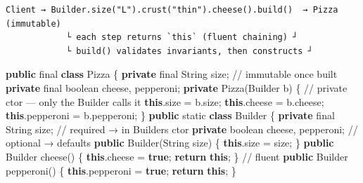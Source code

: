 \documentclass[11pt]{article}
\newenvironment{Shaded}{\begin{snugshade}}{\end{snugshade}}
\newcommand{\BuiltInTok}[1]{\textcolor[rgb]{0.50,0.55,0.55}{#1}}
\newcommand{\CommentTok}[1]{\textcolor[rgb]{0.48,0.49,0.49}{#1}}
\newcommand{\ControlFlowTok}[1]{\textcolor[rgb]{0.99,0.74,0.29}{\textbf{#1}}}
\newcommand{\DataTypeTok}[1]{\textcolor[rgb]{0.16,0.50,0.73}{#1}}
\newcommand{\FunctionTok}[1]{\textcolor[rgb]{0.56,0.27,0.68}{#1}}
\newcommand{\KeywordTok}[1]{\textcolor[rgb]{0.81,0.81,0.76}{\textbf{#1}}}
\newcommand{\NormalTok}[1]{\textcolor[rgb]{0.81,0.81,0.76}{#1}}
\newcommand{\OperatorTok}[1]{\textcolor[rgb]{0.81,0.81,0.76}{#1}}
\begin{document}
\setcodelang{}

\begin{verbatim}
Client → Builder.size("L").crust("thin").cheese().build()  → Pizza (immutable)
            └ each step returns `this` (fluent chaining) ┘
            └ build() validates invariants, then constructs ┘
\end{verbatim}


\begin{Shaded}
\begin{Highlighting}[]
\KeywordTok{public} \DataTypeTok{final} \KeywordTok{class}\NormalTok{ Pizza }\OperatorTok{\{}
    \KeywordTok{private} \DataTypeTok{final} \BuiltInTok{String}\NormalTok{ size}\OperatorTok{;}        \CommentTok{// immutable once built}
    \KeywordTok{private} \DataTypeTok{final} \DataTypeTok{boolean}\NormalTok{ cheese}\OperatorTok{,}\NormalTok{ pepperoni}\OperatorTok{;}
    \KeywordTok{private} \FunctionTok{Pizza}\OperatorTok{(}\NormalTok{Builder b}\OperatorTok{)} \OperatorTok{\{}        \CommentTok{// private ctor — only the Builder calls it}
        \KeywordTok{this}\OperatorTok{.}\FunctionTok{size} \OperatorTok{=}\NormalTok{ b}\OperatorTok{.}\FunctionTok{size}\OperatorTok{;} \KeywordTok{this}\OperatorTok{.}\FunctionTok{cheese} \OperatorTok{=}\NormalTok{ b}\OperatorTok{.}\FunctionTok{cheese}\OperatorTok{;} \KeywordTok{this}\OperatorTok{.}\FunctionTok{pepperoni} \OperatorTok{=}\NormalTok{ b}\OperatorTok{.}\FunctionTok{pepperoni}\OperatorTok{;}
    \OperatorTok{\}}
    \KeywordTok{public} \DataTypeTok{static} \KeywordTok{class}\NormalTok{ Builder }\OperatorTok{\{}
        \KeywordTok{private} \DataTypeTok{final} \BuiltInTok{String}\NormalTok{ size}\OperatorTok{;}    \CommentTok{// required → in Builder\textquotesingle{}s ctor}
        \KeywordTok{private} \DataTypeTok{boolean}\NormalTok{ cheese}\OperatorTok{,}\NormalTok{ pepperoni}\OperatorTok{;}          \CommentTok{// optional → defaults}
        \KeywordTok{public} \FunctionTok{Builder}\OperatorTok{(}\BuiltInTok{String}\NormalTok{ size}\OperatorTok{)} \OperatorTok{\{} \KeywordTok{this}\OperatorTok{.}\FunctionTok{size} \OperatorTok{=}\NormalTok{ size}\OperatorTok{;} \OperatorTok{\}}
        \KeywordTok{public}\NormalTok{ Builder }\FunctionTok{cheese}\OperatorTok{()}    \OperatorTok{\{} \KeywordTok{this}\OperatorTok{.}\FunctionTok{cheese} \OperatorTok{=} \KeywordTok{true}\OperatorTok{;} \ControlFlowTok{return} \KeywordTok{this}\OperatorTok{;} \OperatorTok{\}}     \CommentTok{// fluent}
        \KeywordTok{public}\NormalTok{ Builder }\FunctionTok{pepperoni}\OperatorTok{()} \OperatorTok{\{} \KeywordTok{this}\OperatorTok{.}\FunctionTok{pepperoni} \OperatorTok{=} \KeywordTok{true}\OperatorTok{;} \ControlFlowTok{return} \KeywordTok{this}\OperatorTok{;} \OperatorTok{\}}

\end{Highlighting}
\end{Shaded}
\end{document}
